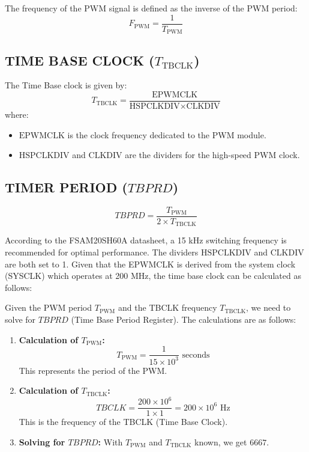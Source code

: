 The frequency of the PWM signal is defined as the inverse of the PWM period:
\begin{equation}
	F_{\text{PWM}} = \frac{1}{T_{\text{PWM}}}
\end{equation}

\subsection{TIME BASE CLOCK (\( T_{\text{TBCLK}} \))}

The Time Base clock is given by:
\begin{equation}
	T_{\text{TBCLK}} = \frac{\text{EPWMCLK}}{\text{HSPCLKDIV} \times \text{CLKDIV}}
\end{equation}
where:
\begin{itemize}
	\item \( \text{EPWMCLK} \) is the clock frequency dedicated to the PWM module.
	\item \( \text{HSPCLKDIV} \) and \( \text{CLKDIV} \) are the dividers for the high-speed PWM clock.
\end{itemize}

\subsection{TIMER PERIOD (\( TBPRD \))}

\begin{equation}
	TBPRD = \frac{T_{\text{PWM}}}{2 \times T_{\text{TBCLK}}}
\end{equation}

According to the FSAM20SH60A datasheet, a 15 kHz switching frequency is recommended for optimal performance. The dividers \( \text{HSPCLKDIV} \) and \( \text{CLKDIV} \) are both set to 1. Given that the EPWMCLK is derived from the system clock (SYSCLK) which operates at 200 MHz, the time base clock can be calculated as follows:

Given the PWM period \( T_{\text{PWM}} \) and the TBCLK frequency \( T_{\text{TBCLK}} \), we need to solve for \( TBPRD \) (Time Base Period Register). The calculations are as follows:

\begin{enumerate}
	\item \textbf{Calculation of \( T_{\text{PWM}} \):}
	\[
		T_{\text{PWM}} = \frac{1}{15 \times 10^3} \text{ seconds}
	\]
	This represents the period of the PWM.

	\item \textbf{Calculation of \( T_{\text{TBCLK}} \):}
	\[
		TBCLK = \frac{200 \times 10^6}{1 \times 1} = 200 \times 10^6 \text{ Hz}
	\]
	This is the frequency of the TBCLK (Time Base Clock).

	\item \textbf{Solving for \( TBPRD \):}
	With \( T_{\text{PWM}} \) and \( T_{\text{TBCLK}} \) known, we get $6667$.
\end{enumerate}

